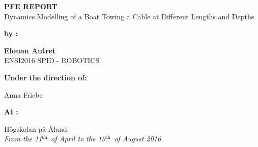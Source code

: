 \begingroup
\thispagestyle{empty}
\begin{center}
\vspace*{1cm}
{\LARGE \textsc{\textbf{PFE REPORT}}}\\
\vspace*{2cm}
{\Large Dynamics Modelling of a Boat Towing a Cable at Different Lengths and Depths}\par %
\end{center}
\vspace*{2cm}

\textbf{by :} 

\begin{center}
{
\Large
\textbf{Elouan Autret}\\
\large ENSI2016 SPID - ROBOTICS
}
\end{center}

\vspace*{1cm}

{\textbf{Under the direction of:}}\\
\begin{center}
{\Large
Anna Friebe
}
\end{center}

\vspace*{1cm}

{\textbf{At :}}\\
\begin{center}
{\Large
H\"{o}gskolan p\r{a} \r{A}land\\
\textit{From the 11$^{\textnormal{th}}$ of April to the 19$^{\textnormal{th}}$ of August 2016}
}



\end{center}
\endgroup



